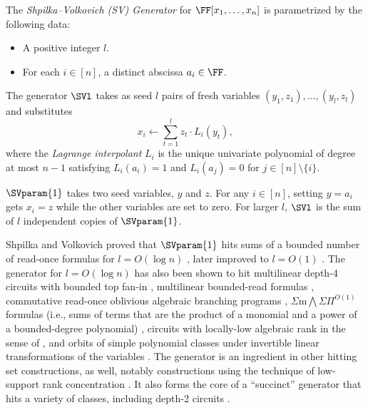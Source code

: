 \begin{definition}[SV generator]
    \label{def.sv}
    The \emph{Shpilka--Volkovich (SV) Generator} for \(\FF[x_1,\dots,x_n]\) is paramet\-rized by the following data:    %
    \begin{itemize}
        \item A positive integer \(l\).
        \item For each \(i \in [n]\), a distinct abscissa \(a_i\in \FF\).
    \end{itemize}
    The generator \(\SVl\) takes as seed \(l\) pairs of fresh variables
    \((y_1,z_1),\ldots,(y_l,z_l)\) and substitutes
    \begin{equation}\label{eq-sv-sub}
    x_i\gets\sum_{t=1}^l  z_t \cdot L_i(y_t),
    \end{equation}
    where the \emph{Lagrange interpolant} $L_i$ is the unique univariate polynomial of degree at most $n-1$ satisfying $L_i(a_i)=1$ and $L_i(a_j) = 0$ for $j \in [n] \setminus \{i\}$.
\end{definition}
$\SVparam{1}$ takes two seed variables, $y$ and $z$. For any $i \in [n]$, setting $y=a_i$ gets $x_i=z$ while the other variables are set to zero. For larger $l$, $\SVl$ is the sum of $l$ independent copies of $\SVparam{1}$. 

Shpilka and Volkovich proved that $\SVparam{1}$ hits sums of a bounded number of read-once formulas for
$l=O(\log n)$ \cite{ShpilkaVolkovich2008}, later improved to $l=O(1)$ \cite{MinahanVolkovich2017}.
The generator for $l=O(\log n)$ has also been shown to hit multilinear
depth-4 circuits with bounded top fan-in \cite{KMSV2009},
multilinear bounded-read formulas \cite{AvMV2011},
commutative read-once oblivious algebraic branching programs \cite{FSS2014},
%
%
\(\Sigma\mathrm{m}\bigwedge\Sigma\Pi^{O(1)}\) formulas (i.e., sums of terms that are the product of a monomial and a power of a bounded-degree polynomial) \cite{Forbes2015},
circuits with locally-low algebraic rank in the sense of
\cite{KumarSaraf2016},
and orbits of simple polynomial classes under invertible linear
transformations of the variables \cite{MediniShpilka2021}.
The generator is an ingredient in other hitting set constructions, as well,
notably constructions using the technique of low-support rank concentration
\cite{ASS2013,AGKS2014,GKST2015,GKS2016,SahaThankey2021,BhargavaGhosh2021}.
It also forms the core of a ``succinct'' generator that hits a variety of
classes, including depth-2 circuits \cite{FSV2018}.

